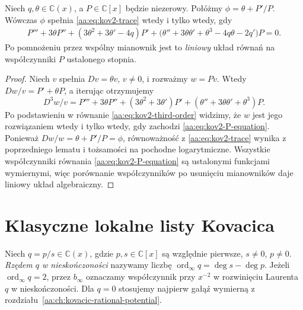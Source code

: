 \begin{lemat}
\label{aa:lem:kov2-polynomial-equation}
Niech $q,\theta\in\mathbb C(x)$,
a $P\in\mathbb C[x]$ będzie
niezerowy. Połóżmy
$\phi=\theta+P'/P$.
Wówczas $\phi$ spełnia
\eqref{aa:eq:kov2-trace}
wtedy i tylko wtedy, gdy
\begin{equation}\label{aa:eq:kov2-P-equation}
\begin{split}
 P''' +3\theta P''
  +(3\theta^2+3\theta'-4q)P'
  +\bigl(\theta''+3\theta\theta'
         +\theta^3-4q\theta-2q'\bigr)P=0.
\end{split}
\end{equation}
Po pomnożeniu przez
wspólny mianownik jest to
\emph{liniowy} układ równań
na współczynniki $P$
ustalonego stopnia.
\end{lemat}
\begin{proof}
Niech $v$ spełnia $Dv=\theta v$,
$v\ne0$, i rozważmy $w=Pv$.
Wtedy $Dw/v=P'+\theta P$,
a iterując otrzymujemy
\[
 D^3w/v=P'''+3\theta P''
 +(3\theta^2+3\theta')P'
 +(\theta''+3\theta\theta'+\theta^3)P.
\]
Po podstawieniu w równanie
\eqref{aa:eq:kov2-third-order}
widzimy, że $w$ jest jego
rozwiązaniem wtedy i tylko wtedy,
gdy zachodzi
\eqref{aa:eq:kov2-P-equation}.
Ponieważ
$Dw/w=\theta+P'/P=\phi$,
równoważność z
\eqref{aa:eq:kov2-trace}
wynika z poprzedniego lematu
i tożsamości na pochodne
logarytmiczne. Wszystkie
współczynniki równania
\eqref{aa:eq:kov2-P-equation}
są ustalonymi funkcjami
wymiernymi, więc porównanie
współczynników po usunięciu
mianowników daje liniowy
układ algebraiczny.
\end{proof}

\section{Klasyczne lokalne listy Kovacica}

\begin{definicja}
\label{aa:def:kov2-infinity-order}
Niech $q=p/s\in\mathbb C(x)$,
gdzie $p,s\in\mathbb C[x]$
są względnie pierwsze,
$s\ne0$, $p\ne0$.
\emph{Rzędem $q$ w nieskończoności}
nazywamy liczbę
$\operatorname{ord}_{\infty}q
=\deg s-\deg p$.
Jeżeli $\operatorname{ord}_{\infty}q=2$,
przez $b_\infty$ oznaczamy
współczynnik przy $x^{-2}$
w rozwinięciu Laurenta $q$
w nieskończoności.
Dla $q=0$ stosujemy
najpierw gałąź wymierną
z rozdziału~\ref{aa:ch:kovacic-rational-potential}.
\end{definicja}


